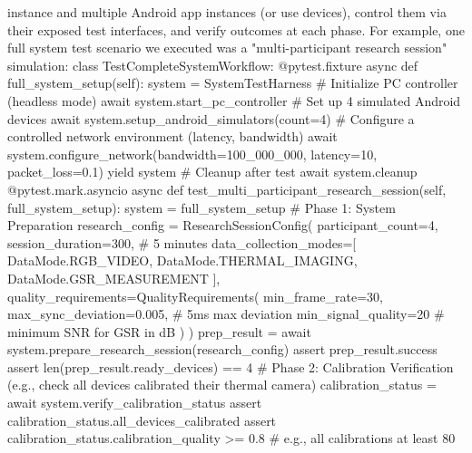 instance and multiple Android app instances (or use devices), control them via their exposed test interfaces, and verify outcomes at each phase. For example, one full system test scenario we executed was a "multi-participant research session" simulation: class TestCompleteSystemWorkflow: @pytest.fixture async def full_system_setup(self): system = SystemTestHarness # Initialize PC controller (headless mode) await system.start_pc_controller # Set up 4 simulated Android devices await system.setup_android_simulators(count=4) # Configure a controlled network environment (latency, bandwidth) await system.configure_network(bandwidth=100_000_000, latency=10, packet_loss=0.1) yield system # Cleanup after test await system.cleanup @pytest.mark.asyncio async def test_multi_participant_research_session(self, full_system_setup): system = full_system_setup # Phase 1: System Preparation research_config = ResearchSessionConfig( participant_count=4, session_duration=300, # 5 minutes data_collection_modes=[ DataMode.RGB_VIDEO, DataMode.THERMAL_IMAGING, DataMode.GSR_MEASUREMENT ], quality_requirements=QualityRequirements( min_frame_rate=30, max_sync_deviation=0.005, # 5ms max deviation min_signal_quality=20 # minimum SNR for GSR in dB ) ) prep_result = await system.prepare_research_session(research_config) assert prep_result.success assert len(prep_result.ready_devices) == 4 # Phase 2: Calibration Verification (e.g., check all devices calibrated their thermal camera) calibration_status = await system.verify_calibration_status assert calibration_status.all_devices_calibrated assert calibration_status.calibration_quality >= 0.8 # e.g., all calibrations at least 80%